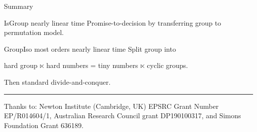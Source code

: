 \documentclass{beamer}
\begin{document}


\begin{frame}{Summary}

\begin{block}{IsGroup nearly linear time}
    Promise-to-decision by transferring group to permutation model.
\end{block}

\begin{block}{GroupIso most orders nearly linear time}
    Split group into
    \begin{center} 
        hard group $\ltimes$ hard numbers 
        = tiny numbers $\ltimes$ cyclic groups.
    \end{center}
    Then standard divide-and-conquer.
\end{block}

\rule{\textwidth}{1pt}
{\tiny Thanks to: Newton Institute (Cambridge, UK) 
EPSRC Grant Number EP/R014604/1, Australian Research Council grant
DP190100317, and Simons Foundation Grant 636189.}
\end{frame}





    






    
\end{document}
